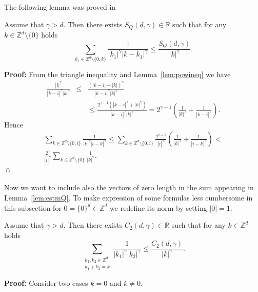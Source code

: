 The following  lemma was proved in \cite{Sa}
\begin{lemma} \cite[Lemma 3.3]{ZKS3}
\label{lem:estmQ} Assume that $\gamma > d$.  Then there exists
$S_Q(d,\gamma) \in \mathbb{R}$ such that for any $k \in
\mathbb{Z}^d \setminus \{0\}$ holds
\begin{equation*}
  \sum_{k_1 \in \mathbb{Z}^d \setminus \{0, k \}} \frac{1}{|k_1|^\gamma |k-k_1|^\gamma} \leq
    \frac{S_Q(d,\gamma)}{|k|^{\gamma}}.
\end{equation*}
\end{lemma}
\textbf{Proof:} From the triangle inequality and
Lemma~\ref{lem:powineq} we have
\begin{eqnarray*}
  \frac{|i|^\gamma}{|k-i|^\gamma |k|^\gamma} &\leq&
  \frac{\left( |k-i| + |k| \right)^\gamma}{|k-i|^\gamma |k|^\gamma} \\
 & & \leq  \frac{ 2^{\gamma -1}(|k-i|^\gamma + |k|^\gamma)}{|k-i|^\gamma
  |k|^\gamma} =
  2^{\gamma -1} \left( \frac{1}{|k|^\gamma} + \frac{1}{|k-i|^\gamma}
  \right).
\end{eqnarray*}
Hence
\begin{eqnarray*}
 \sum_{k \in {\mathbb Z}^d\setminus \{0,i\}} \frac{1}{|k|^\gamma |i -
  k|^\gamma} \leq  \sum_{k \in {\mathbb Z}^d\setminus \{0,i\}} \frac{2^{\gamma-1}}{|i|^\gamma}
  \left( \frac{1}{|k|^\gamma} +\frac{1}{ |i -
  k|^\gamma}\right) <  \\ \frac{2^{\gamma}}{|i|^\gamma} \sum_{k \in {\mathbb Z}^d \setminus \{0\}}
  \frac{1}{|k|^\gamma}.
\end{eqnarray*}
 \qed

Now we want to include  also the vectors of zero length in the sum
appearing in Lemma~\ref{lem:estmQ}.  To make
expression of some formulas less cumbersome in this subsection for
$0=\{0\}^d \in \mathbb{Z}^d$ we redefine its norm by setting
$|0|=1$.
\begin{lemma} \cite[Lemma 3.4]{ZKS3}
\label{lem:estmQ2} Assume that $\gamma > d$.  Then there exists
$C_2(d,\gamma) \in \mathbb{R}$ such that for any $k \in
\mathbb{Z}^d$ holds
\begin{equation*}
  \sum_{\substack{k_1,k_2 \in \mathbb{Z}^d\\ k_1+k_2=k}} \frac{1}{|k_1|^\gamma |k_2|^\gamma} \leq
    \frac{C_2(d,\gamma)}{|k|^{\gamma}}.
\end{equation*}
\end{lemma}
\textbf{Proof:} Consider two cases $k=0$ and $k \neq 0$.

